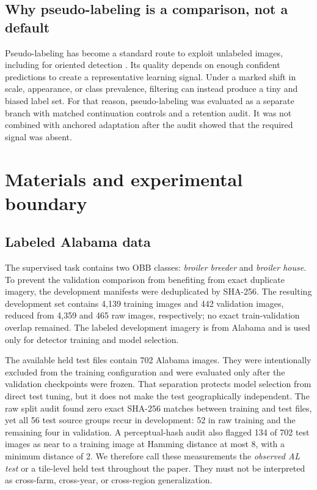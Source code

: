 \documentclass[preprint,12pt,authoryear]{elsarticle}
\begin{document}
\subsection{Why pseudo-labeling is a comparison, not a default}

Pseudo-labeling has become a standard route to exploit unlabeled images, including for oriented detection \citep{hua2023sood}. Its quality depends on enough confident predictions to create a representative learning signal. Under a marked shift in scale, appearance, or class prevalence, filtering can instead produce a tiny and biased label set. For that reason, pseudo-labeling was evaluated as a separate branch with matched continuation controls and a retention audit. It was not combined with anchored adaptation after the audit showed that the required signal was absent.

\section{Materials and experimental boundary}
\label{sec:materials}

\subsection{Labeled Alabama data}

The supervised task contains two OBB classes: \emph{broiler breeder} and \emph{broiler house}. To prevent the validation comparison from benefiting from exact duplicate imagery, the development manifests were deduplicated by SHA-256. The resulting development set contains 4,139 training images and 442 validation images, reduced from 4,359 and 465 raw images, respectively; no exact train-validation overlap remained. The labeled development imagery is from Alabama and is used only for detector training and model selection.

The available held test files contain 702 Alabama images. They were intentionally excluded from the training configuration and were evaluated only after the validation checkpoints were frozen. That separation protects model selection from direct test tuning, but it does not make the test geographically independent. The raw split audit found zero exact SHA-256 matches between training and test files, yet all 56 test source groups recur in development: 52 in raw training and the remaining four in validation. A perceptual-hash audit also flagged 134 of 702 test images as near to a training image at Hamming distance at most 8, with a minimum distance of 2. We therefore call these measurements the \emph{observed AL test} or a tile-level held test throughout the paper. They must not be interpreted as cross-farm, cross-year, or cross-region generalization.
\end{document}
